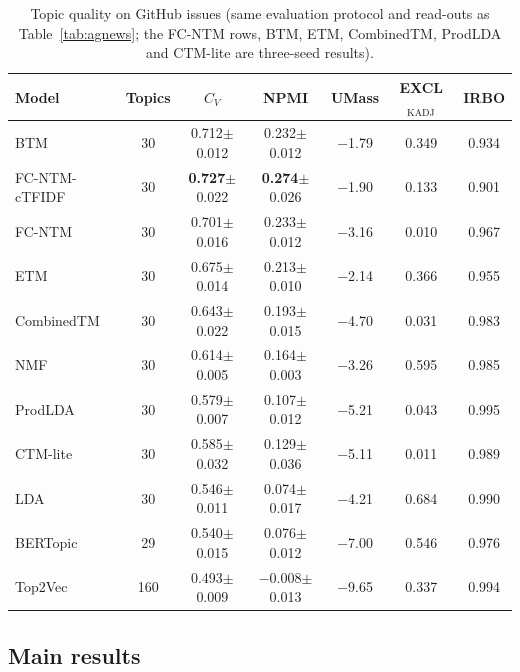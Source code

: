 \documentclass[Journal,letterpaper]{ascelike-new}
\newcommand{\fcntm}{FC-NTM}
\begin{document}
\begin{table}[t]
\centering
\caption{Topic quality on GitHub issues (same evaluation protocol and read-outs as Table~\ref{tab:agnews}; the FC-NTM rows, BTM, ETM, CombinedTM, ProdLDA and CTM-lite are three-seed results).}
\label{tab:github}
\small
\begin{tabular}{lcccccc}
\toprule
Model & Topics & $C_V$ & NPMI & UMass & EXCL$_{\mathrm{KADJ}}$ & IRBO \\
\midrule
BTM & 30 & 0.712$\pm$0.012 & 0.232$\pm$0.012 & $-$1.79 & 0.349 & 0.934 \\
\fcntm{}-cTFIDF & 30 & \textbf{0.727}$\pm$0.022 & \textbf{0.274}$\pm$0.026 & $-$1.90 & 0.133 & 0.901 \\
\fcntm{} & 30 & 0.701$\pm$0.016 & 0.233$\pm$0.012 & $-$3.16 & 0.010 & 0.967 \\
ETM & 30 & 0.675$\pm$0.014 & 0.213$\pm$0.010 & $-$2.14 & 0.366 & 0.955 \\
CombinedTM & 30 & 0.643$\pm$0.022 & 0.193$\pm$0.015 & $-$4.70 & 0.031 & 0.983 \\
NMF & 30 & 0.614$\pm$0.005 & 0.164$\pm$0.003 & $-$3.26 & 0.595 & 0.985 \\
ProdLDA & 30 & 0.579$\pm$0.007 & 0.107$\pm$0.012 & $-$5.21 & 0.043 & 0.995 \\
CTM-lite & 30 & 0.585$\pm$0.032 & 0.129$\pm$0.036 & $-$5.11 & 0.011 & 0.989 \\
LDA & 30 & 0.546$\pm$0.011 & 0.074$\pm$0.017 & $-$4.21 & 0.684 & 0.990 \\
BERTopic & 29 & 0.540$\pm$0.015 & 0.076$\pm$0.012 & $-$7.00 & 0.546 & 0.976 \\
Top2Vec & 160 & 0.493$\pm$0.009 & $-$0.008$\pm$0.013 & $-$9.65 & 0.337 & 0.994 \\
\bottomrule
\end{tabular}
\end{table}

\subsection{Main results}
\end{document}
